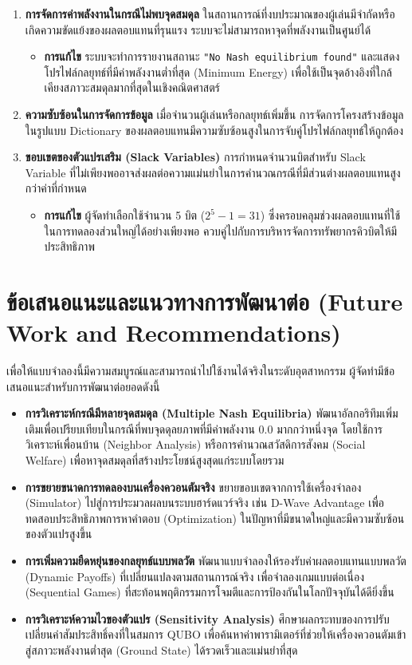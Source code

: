 \begin{enumerate}
    \item \textbf{การจัดการค่าพลังงานในกรณีไม่พบจุดสมดุล} ในสถานการณ์ที่งบประมาณของผู้เล่นมีจำกัดหรือเกิดความขัดแย้งของผลตอบแทนที่รุนแรง ระบบจะไม่สามารถหาจุดที่พลังงานเป็นศูนย์ได้
    \begin{itemize}
        \item \textbf{การแก้ไข} ระบบจะทำการรายงานสถานะ \texttt{"No Nash equilibrium found"} และแสดงโปรไฟล์กลยุทธ์ที่มีค่าพลังงานต่ำที่สุด (Minimum Energy) เพื่อใช้เป็นจุดอ้างอิงที่ใกล้เคียงสภาวะสมดุลมากที่สุดในเชิงคณิตศาสตร์
    \end{itemize}
    \item \textbf{ความซับซ้อนในการจัดการข้อมูล} เมื่อจำนวนผู้เล่นหรือกลยุทธ์เพิ่มขึ้น การจัดการโครงสร้างข้อมูลในรูปแบบ Dictionary ของผลตอบแทนมีความซับซ้อนสูงในการจับคู่โปรไฟล์กลยุทธ์ให้ถูกต้อง
    \item \textbf{ขอบเขตของตัวแปรเสริม (Slack Variables)} การกำหนดจำนวนบิตสำหรับ Slack Variable ที่ไม่เพียงพออาจส่งผลต่อความแม่นยำในการคำนวณกรณีที่มีส่วนต่างผลตอบแทนสูงกว่าค่าที่กำหนด
    \begin{itemize}
        \item \textbf{การแก้ไข} ผู้จัดทำเลือกใช้จำนวน 5 บิต ($2^5 - 1 = 31$) ซึ่งครอบคลุมช่วงผลตอบแทนที่ใช้ในการทดลองส่วนใหญ่ได้อย่างเพียงพอ ควบคู่ไปกับการบริหารจัดการทรัพยากรคิวบิตให้มีประสิทธิภาพ
    \end{itemize}
\end{enumerate}

\section{ข้อเสนอแนะและแนวทางการพัฒนาต่อ (Future Work and Recommendations)}
เพื่อให้แบบจำลองนี้มีความสมบูรณ์และสามารถนำไปใช้งานได้จริงในระดับอุตสาหกรรม ผู้จัดทำมีข้อเสนอแนะสำหรับการพัฒนาต่อยอดดังนี้

\begin{itemize}
    \item \textbf{การวิเคราะห์กรณีมีหลายจุดสมดุล (Multiple Nash Equilibria)} พัฒนาอัลกอริทึมเพิ่มเติมเพื่อเปรียบเทียบในกรณีที่พบจุดดุลยภาพที่มีค่าพลังงาน $0.0$ มากกว่าหนึ่งจุด โดยใช้การวิเคราะห์เพื่อนบ้าน (Neighbor Analysis) หรือการคำนวณสวัสดิการสังคม (Social Welfare) เพื่อหาจุดสมดุลที่สร้างประโยชน์สูงสุดแก่ระบบโดยรวม
    \item \textbf{การขยายขนาดการทดลองบนเครื่องควอนตัมจริง} ขยายขอบเขตจากการใช้เครื่องจำลอง (Simulator) ไปสู่การประมวลผลบนระบบฮาร์ดแวร์จริง เช่น D-Wave Advantage เพื่อทดสอบประสิทธิภาพการหาคำตอบ (Optimization) ในปัญหาที่มีขนาดใหญ่และมีความซับซ้อนของตัวแปรสูงขึ้น
    \item \textbf{การเพิ่มความยืดหยุ่นของกลยุทธ์แบบพลวัต} พัฒนาแบบจำลองให้รองรับค่าผลตอบแทนแบบพลวัต (Dynamic Payoffs) ที่เปลี่ยนแปลงตามสถานการณ์จริง เพื่อจำลองเกมแบบต่อเนื่อง (Sequential Games) ที่สะท้อนพฤติกรรมการโจมตีและการป้องกันในโลกปัจจุบันได้ดียิ่งขึ้น
    \item \textbf{การวิเคราะห์ความไวของตัวแปร (Sensitivity Analysis)} ศึกษาผลกระทบของการปรับเปลี่ยนค่าสัมประสิทธิ์คงที่ในสมการ QUBO เพื่อค้นหาค่าพารามิเตอร์ที่ช่วยให้เครื่องควอนตัมเข้าสู่สภาวะพลังงานต่ำสุด (Ground State) ได้รวดเร็วและแม่นยำที่สุด
\end{itemize}